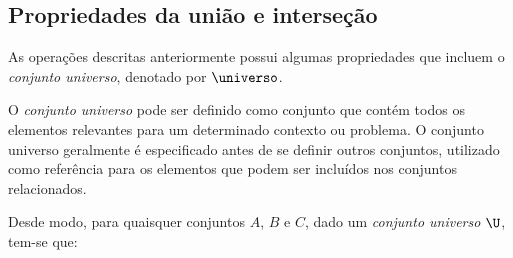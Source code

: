 \subsection{Propriedades da união e interseção}

As operações descritas anteriormente possui algumas propriedades que incluem o \emph{conjunto universo}, denotado por $\universo$. 

O \emph{conjunto universo} pode ser definido como conjunto que contém todos os elementos relevantes para um determinado contexto ou problema. O conjunto universo geralmente é especificado antes de se definir outros conjuntos, utilizado como referência para os elementos que podem ser incluídos nos conjuntos relacionados. 

Desde modo, para quaisquer conjuntos $A$, $B$ e $C$, dado um \emph{conjunto universo} $\U$, tem-se que:

